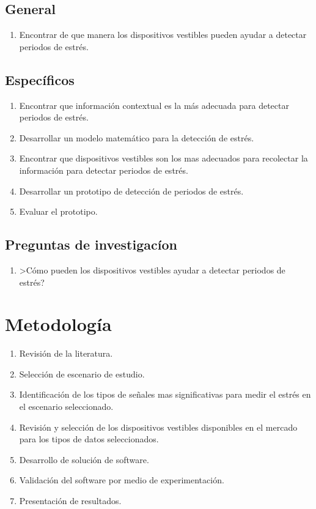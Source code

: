\documentclass[letterpaper,12pt]{cicese}
\begin{document}
			\section{General}
				\begin{enumerate}
					\item Encontrar de que manera los dispositivos vestibles pueden ayudar a detectar periodos de estr\'es.
				\end{enumerate}
			\section{Espec\'ificos}
				\begin{enumerate}
					\item Encontrar que informaci\'on contextual es la m\'as adecuada para detectar periodos de estr\'es.
					\item Desarrollar un modelo matem\'atico para la detecci\'on de estr\'es.
					\item Encontrar que dispositivos vestibles son los mas adecuados para recolectar la informaci\'on para detectar periodos de estr\'es.
					\item Desarrollar un prototipo de detecci\'on de periodos de estr\'es.
					\item Evaluar el prototipo.
				\end{enumerate}
			\section{Preguntas de investigac\'ion}
				\begin{enumerate}
					\item >C\'omo pueden los dispositivos vestibles ayudar a detectar periodos de estr\'es?
				\end{enumerate}
		\chapter{Metodolog\'ia}
				\begin{enumerate}
					\item Revisi\'on de la literatura.
					\item Selecci\'on de escenario de estudio.
					\item Identificaci\'on de los tipos de se\~nales mas significativas para medir el estr\'es en el escenario seleccionado.
					\item Revisi\'on y selecci\'on de los dispositivos vestibles disponibles en el mercado para los tipos de datos seleccionados.
					\item Desarrollo de soluci\'on de software.
					\item Validaci\'on del software por medio de experimentaci\'on.
					\item Presentaci\'on de resultados.
				\end{enumerate}
\end{document}

